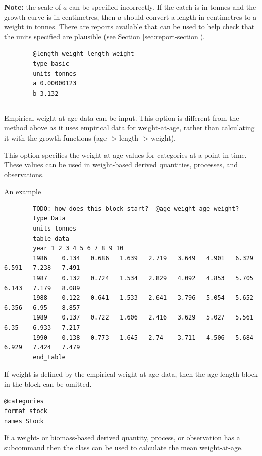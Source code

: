 \textbf{Note:}  the scale of $a$ can be specified incorrectly. If the catch is in tonnes and the growth curve is in centimetres, then $a$ should convert a length in centimetres to a weight in tonnes. There are reports available that can be used to help check that the units specified are plausible (see Section \ref{sec:report-section}).

{\small{\begin{verbatim}
		@length_weight length_weight
		type basic
		units tonnes
		a 0.00000123
		b 3.132
\end{verbatim}}}

\subsection{\label{sec:weight-at-age}}

Empirical weight-at-age data can be input. This option is different from the method above as it uses empirical data for weight-at-age, rather than calculating it with the growth functions (age -> length -> weight).

This option specifies the weight-at-age values for categories at a point in time. These values can be used in weight-based derived quantities, processes, and observations.

An example

{\small{\begin{verbatim}
		TODO: how does this block start?  @age_weight age_weight?
		type Data
		units tonnes
		table data
		year 1 2 3 4 5 6 7 8 9 10
		1986	0.134	0.686	1.639	2.719	3.649	4.901	6.329	6.591	7.238	7.491
		1987	0.132	0.724	1.534	2.829	4.092	4.853	5.705	6.143	7.179	8.089
		1988	0.122	0.641	1.533	2.641	3.796	5.054	5.652	6.356	6.95	8.857
		1989	0.137	0.722	1.606	2.416	3.629	5.027	5.561	6.35	6.933	7.217
		1990	0.138	0.773	1.645	2.74	3.711	4.506	5.684	6.929	7.424	7.479
		end_table
		\end{verbatim}}}

If weight is defined by the empirical weight-at-age data, then the age-length block in the  block can be omitted.

{\small{\begin{verbatim}
@categories
format stock
names Stock
\end{verbatim}}}

If a weight- or biomass-based derived quantity, process, or observation has a  subcommand then the  class can be used to calculate the mean weight-at-age.

